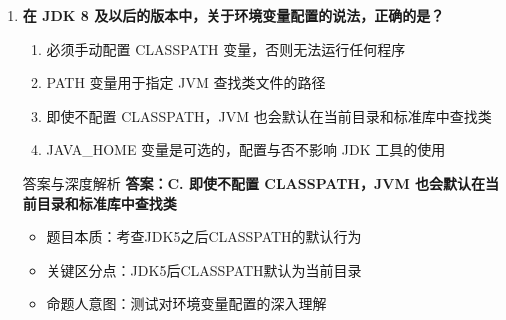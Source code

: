 \documentclass[12pt, a4paper]{ctexart}
\begin{document}
\begin{enumerate}[label=\textbf{\arabic*.}]
\begin{bluebox}{答案与深度解析}
\begin{enumerate}[leftmargin=*, nosep]
			      \item 高频陷阱清单：
			            \begin{itemize}
				            \item 陷阱1：认为javac实现跨平台 → 编译器不负责运行
				            \item 陷阱2：认为API实现跨平台 → API也是JVM的一部分
			            \end{itemize}
		      \end{enumerate}

		      \begin{itemize}
			      \item 记忆口诀：跨平台靠JVM，一次编译到处跑
			      \item 考试看到跨平台就选JVM
		      \end{itemize}
	      \end{bluebox}

	      \newpage

	\item \textbf{在 JDK 8 及以后的版本中，关于环境变量配置的说法，正确的是？}
	      \begin{enumerate}[label=\Alph*.]
		      \item 必须手动配置 CLASSPATH 变量，否则无法运行任何程序
		      \item PATH 变量用于指定 JVM 查找类文件的路径
		      \item 即使不配置 CLASSPATH，JVM 也会默认在当前目录和标准库中查找类
		      \item JAVA\_HOME 变量是可选的，配置与否不影响 JDK 工具的使用
	      \end{enumerate}

	      \begin{bluebox}{答案与深度解析}
		      \textbf{答案：C. 即使不配置 CLASSPATH，JVM 也会默认在当前目录和标准库中查找类}

		      \begin{itemize}[leftmargin=*, nosep]
			      \item 题目本质：考查JDK5之后CLASSPATH的默认行为
			      \item 关键区分点：JDK5后CLASSPATH默认为当前目录
			      \item 命题人意图：测试对环境变量配置的深入理解
		      \end{itemize}



\end{bluebox}
\end{enumerate}
\end{document}
